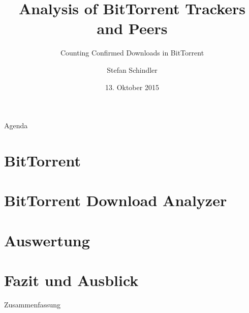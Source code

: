 \documentclass{beamer} %
\title[BitTorrent Downloads]{Analysis of BitTorrent Trackers and Peers}
\subtitle{Counting Confirmed Downloads in BitTorrent}
\author{Stefan Schindler}
\institute[FAU]{Friedrich-Alexander-Universität Erlangen-Nürnberg}
\date{13. Oktober 2015}
\begin{document}
	\begin{frame}
		\titlepage
	\end{frame}

	\begin{frame}{Agenda}
		\tableofcontents
	\end{frame}

	\section{BitTorrent}

	\section{BitTorrent Download Analyzer}

	\section{Auswertung}

	\section{Fazit und Ausblick}

	\begin{frame}{Zusammenfassung}
		\tableofcontents
	\end{frame}
\end{document}
